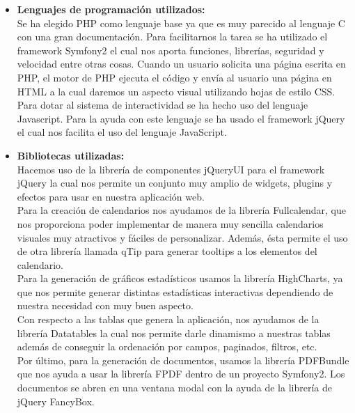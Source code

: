 \documentclass[a4paper,12pt]{article}
\begin{document}
\begin{itemize}
\item \textbf{Lenguajes de programación utilizados:}\\
Se ha elegido PHP como lenguaje base ya que es muy parecido al lenguaje C con una gran documentación. Para facilitarnos la tarea se ha utilizado el framework Symfony2 el cual nos aporta funciones, librerías, seguridad y velocidad entre otras cosas.
Cuando un usuario solicita una página escrita en PHP, el motor de PHP ejecuta el código y envía al usuario una página en HTML a la cual daremos un aspecto visual utilizando hojas de estilo CSS. Para dotar al sistema de interactividad se ha hecho uso del lenguaje Javascript. Para la ayuda con este lenguaje se ha usado el framework jQuery el cual nos facilita el uso del lenguaje JavaScript.

\item \textbf{Bibliotecas utilizadas:}\\
Hacemos uso de la librería de componentes jQueryUI para el framework jQuery la cual nos permite un conjunto muy amplio de widgets, plugins y efectos para usar en nuestra aplicación web.\\ Para la creación de calendarios nos ayudamos de la librería Fullcalendar, que nos proporciona poder implementar de manera muy sencilla calendarios visuales muy atractivos y fáciles de personalizar. Además, ésta permite el uso de otra librería llamada qTip para generar tooltips a los elementos del calendario.\\ Para la generación de gráficos estadísticos usamos la librería HighCharts, ya que nos permite generar distintas estadísticas interactivas dependiendo de nuestra necesidad con muy buen aspecto. \\Con respecto a las tablas que genera la aplicación, nos ayudamos de la librería Datatables la cual nos permite darle dinamismo a nuestras tablas además de conseguir la ordenación por campos, paginados, filtros, etc. \\Por último, para la generación de documentos, usamos la librería PDFBundle que nos ayuda a usar la librería FPDF dentro de un proyecto Symfony2. Los documentos se abren en una ventana modal con la ayuda de la librería de jQuery FancyBox.


\end{itemize}
\end{document}

